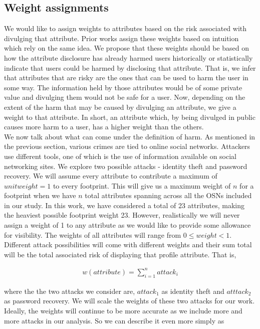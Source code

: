 \documentclass[10pt,conference]{IEEEtran}
\begin{document}
\subsection{Weight assignments}
We would like to assign weights to attributes based on the risk associated with divulging that attribute. Prior works assign these weights based on intuition which rely on the same idea. We propose that these weights should be based on how the attribute disclosure has already harmed users historically or statistically indicate that users could be harmed by disclosing that attribute. That is, we infer that attributes that are risky are the ones that can be used to harm the user in some way. The information held by those attributes would be of some private value and divulging them would not be safe for a user. Now, depending on the extent of the harm that may be caused by divulging an attribute, we give a weight to that attribute. In short, an attribute which, by being divulged in public causes more harm to a user, has a higher weight than the others. \\

We now talk about what can come under the definition of harm. As mentioned in the previous section, various crimes are tied to online social networks. Attackers use different tools, one of which is the use of information available on social networking sites. We explore two possible attacks - identity theft and password recovery. We will assume every attribute to contribute a maximum of $ unit weight = 1 $ to every footprint. This will give us a maximum weight of $  n $ for a footprint when we have $ n $ total attributes spanning across all the OSNs included in our study. In this work, we have considered a total of 23 attributes, making the heaviest possible footprint weight 23. However, realistically we will never assign a weight of 1 to any attribute as we would like to provide some allowance for visibility. The weights of all attributes will range from $ 0 \leq weight < 1 $. Different attack possibilities will come with different weights and their sum total will be the total associated risk of displaying that profile attribute. That is,

\begin{align*}
w(attribute) = \sum_{i=1}^{n}attack_i
\end{align*}

where the the two attacks we consider are, $ attack_1 $ as identity theft and $ atttack_2 $ as password recovery. We will scale the weights of these two attacks for our work. Ideally, the weights will continue to be more accurate as we include more and more attacks in our analysis. So we can describe it even more simply as
\end{document}
